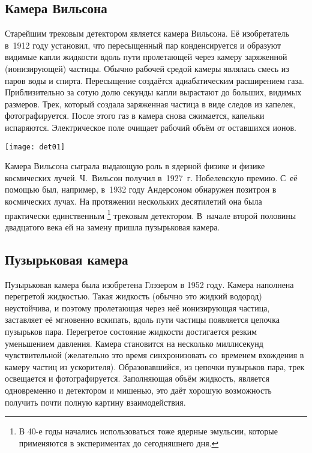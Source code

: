 \subsection{Камера Вильсона}
Старейшим трековым детектором является камера Вильсона. Её изобретатель
в~1912 году установил, что пересыщенный пар конденсируется и образуют
видимые капли жидкости вдоль пути пролетающей через камеру заряженной
(ионизирующей) частицы. Обычно рабочей средой камеры являлась смесь из
паров воды и спирта. Пересыщение создаётся адиабатическим расширением
газа. Приблизительно за сотую долю секунды капли вырастают до больших,
видимых размеров. Трек, который создала заряженная частица в виде следов
из капелек, фотографируется. После этого газ в камера снова сжимается,
капельки испаряются. Электрическое поле очищает рабочий объём от
оставшихся ионов.
\begin{floatingfigure}[r]{7.2cm}
  \hspace{-0.5cm}
  \texttt{[image: det01]}
\end{floatingfigure}
Камера Вильсона сыграла выдающую роль в ядерной физике и физике
космических лучей. Ч.~Вильсон получил в~1927~г. Нобелевскую премию.
С~её помощью был, например, в~1932 году Андерсоном обнаружен позитрон
в космических лучах.
На протяжении нескольких десятилетий она была практически единственным
\footnote{В 40-е годы начались использоваться тоже ядерные эмульсии,
  которые применяются в экспериментах до сегодняшнего дня.} трековым
детектором. В~начале второй половины двадцатого века ей на замену
пришла пузырьковая камера.

\subsection{Пузырьковая камера}
Пузырьковая камера была изобретена Глэзером в 1952 году. Камера наполнена
перегретой жидкостью. Такая жидкость (обычно это жидкий водород)
неустойчива, и поэтому пролетающая через неё ионизирующая частица,
заставляет её мгновенно вскипать, вдоль пути частицы появляется цепочка
пузырьков пара. Перегретое состояние жидкости достигается резким
уменьшением давления. Камера становится на несколько миллисекунд
чувствительной (желательно это время синхронизовать со~временем
вхождения в камеру частиц из ускорителя). Образовавшийся, из цепочки
пузырьков пара, трек освещается и фотографируется. Заполняющая объём
жидкость, является одновременно и детектором и мишенью, это даёт
хорошую возможность получить почти полную картину взаимодействия.

